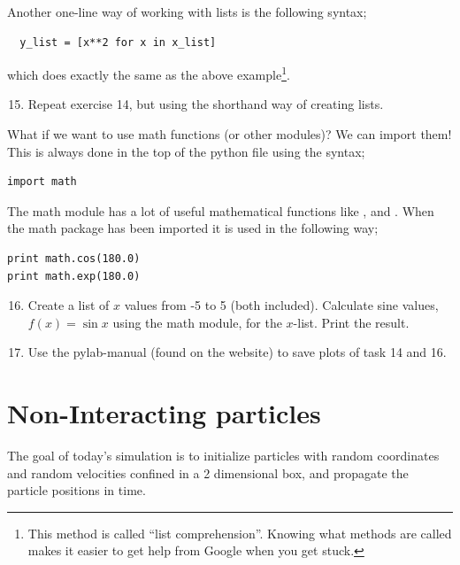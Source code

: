 \documentclass{article}
\begin{document}
Another one-line way of working with lists is the following syntax;

\begin{lstlisting}
  y_list = [x**2 for x in x_list]
\end{lstlisting}

which does exactly the same as the above example\footnote{This method is
called ``list comprehension''. Knowing what methods are called makes
it easier to get help from Google when you get stuck. }.

\begin{enumerate}
  \setcounter{enumi}{14}
  \item Repeat exercise 14, but using the shorthand way of creating lists.
\end{enumerate}

What if we want to use math functions (or other modules)?
We can import them! This is always done in the top of the
python file using the syntax;

\begin{lstlisting}
import math
\end{lstlisting}

The math module has a lot of useful mathematical functions like ,
 and . When the math package has been imported it is used
in the following way;

\begin{lstlisting}
print math.cos(180.0)
print math.exp(180.0)
\end{lstlisting}

\begin{enumerate}
  \setcounter{enumi}{15}
  \item Create a list of $x$ values from -5 to 5 (both included).
    Calculate sine values, $f(x) = \sin{x}$ using the math module,
    for the $x$-list.
    Print the result.
  \item Use the pylab-manual (found on the website) to save plots of 
    task 14 and 16.
\end{enumerate}


\newpage
\section{Non-Interacting particles}

The goal of today's simulation is to initialize particles with random
coordinates and random velocities confined in a 2 dimensional box,
and propagate the particle positions in time.\\
\end{document}
